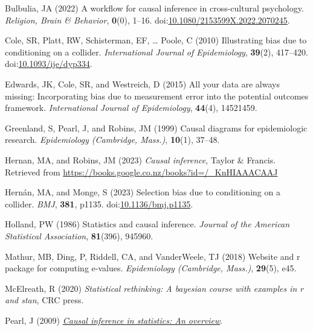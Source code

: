 \documentclass[
  singlecolumn]{article}
\newlength{\cslhangindent}
\newlength{\cslentryspacingunit} %
\newenvironment{CSLReferences}[2] %
 {%
  \setlength{\parindent}{0pt}
  \ifodd #1
  \let\oldpar\par
  \def\par{\hangindent=\cslhangindent\oldpar}
  \fi
  \setlength{\parskip}{#2\cslentryspacingunit}
 }%
 {}
\begin{document}
\hypertarget{refs}{}
\begin{CSLReferences}{1}{0}
\leavevmode{}%
Bulbulia, JA (2022) A workflow for causal inference in cross-cultural
psychology. \emph{Religion, Brain \& Behavior}, \textbf{0}(0), 1--16.
doi:\href{https://doi.org/10.1080/2153599X.2022.2070245}{10.1080/2153599X.2022.2070245}.

\leavevmode{}%
Cole, SR, Platt, RW, Schisterman, EF, \ldots{} Poole, C (2010)
Illustrating bias due to conditioning on a collider. \emph{International
Journal of Epidemiology}, \textbf{39}(2), 417--420.
doi:\href{https://doi.org/10.1093/ije/dyp334}{10.1093/ije/dyp334}.

\leavevmode{}%
Edwards, JK, Cole, SR, and Westreich, D (2015) All your data are always
missing: Incorporating bias due to measurement error into the potential
outcomes framework. \emph{International Journal of Epidemiology},
\textbf{44}(4), 14521459.

\leavevmode{}%
Greenland, S, Pearl, J, and Robins, JM (1999) Causal diagrams for
epidemiologic research. \emph{Epidemiology (Cambridge, Mass.)},
\textbf{10}(1), 37--48.

\leavevmode{}%
Hernan, MA, and Robins, JM (2023) \emph{Causal inference}, Taylor \&
Francis. Retrieved from
\url{https://books.google.co.nz/books?id=/_KnHIAAACAAJ}

\leavevmode{}%
Hernán, MA, and Monge, S (2023) Selection bias due to conditioning on a
collider. \emph{BMJ}, \textbf{381}, p1135.
doi:\href{https://doi.org/10.1136/bmj.p1135}{10.1136/bmj.p1135}.

\leavevmode{}%
Holland, PW (1986) Statistics and causal inference. \emph{Journal of the
American Statistical Association}, \textbf{81}(396), 945960.

\leavevmode{}%
Mathur, MB, Ding, P, Riddell, CA, and VanderWeele, TJ (2018) Website and
r package for computing e-values. \emph{Epidemiology (Cambridge,
Mass.)}, \textbf{29}(5), e45.

\leavevmode{}%
McElreath, R (2020) \emph{Statistical rethinking: A bayesian course with
examples in r and stan}, CRC press.

\leavevmode{}%
Pearl, J (2009) \emph{\href{https://doi.org/10.1214/09-SS057}{Causal
inference in statistics: An overview}}.


\end{CSLReferences}
\end{document}
